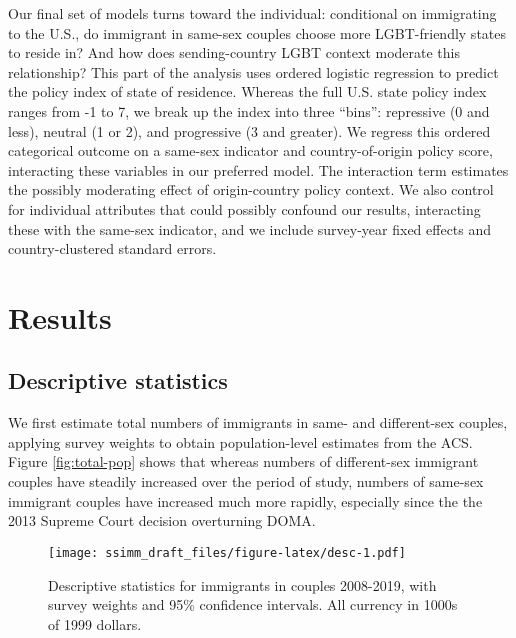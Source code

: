 \documentclass[
  11pt,
]{article}
\begin{document}
Our final set of models turns toward the individual: conditional on immigrating to the U.S., do immigrant in same-sex couples choose more LGBT-friendly states to reside in? And how does sending-country LGBT context moderate this relationship? This part of the analysis uses ordered logistic regression to predict the policy index of state of residence. Whereas the full U.S. state policy index ranges from -1 to 7, we break up the index into three ``bins'': repressive (0 and less), neutral (1 or 2), and progressive (3 and greater). We regress this ordered categorical outcome on a same-sex indicator and country-of-origin policy score, interacting these variables in our preferred model. The interaction term estimates the possibly moderating effect of origin-country policy context. We also control for individual attributes that could possibly confound our results, interacting these with the same-sex indicator, and we include survey-year fixed effects and country-clustered standard errors.

\hypertarget{results}{%
\section{Results}\label{results}}

\hypertarget{descriptive-statistics}{%
\subsection{Descriptive statistics}\label{descriptive-statistics}}

We first estimate total numbers of immigrants in same- and different-sex couples, applying survey weights to obtain population-level estimates from the ACS. Figure \ref{fig:total-pop} shows that whereas numbers of different-sex immigrant couples have steadily increased over the period of study, numbers of same-sex immigrant couples have increased much more rapidly, especially since the the 2013 Supreme Court decision overturning DOMA.

\begin{figure}
\centering
\texttt{[image: ssimm\_draft\_files/figure-latex/desc-1.pdf]}
\caption{\label{fig:desc}Descriptive statistics for immigrants in couples 2008-2019, with survey weights and 95\% confidence intervals. All currency in 1000s of 1999 dollars.}
\end{figure}
\end{document}
